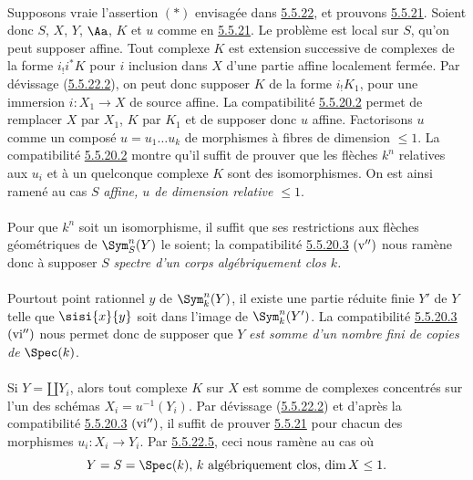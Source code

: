 \documentclass[10pt]{../fichiers-configuration-latex/smfart}
\begin{document}
\paragraph{}
Supposons vraie l'assertion $(\ast)$ envisagée dans \hyperref[XVII.lem5.5.22]{5.5.22}, et
prouvons \hyperref[XVII.thm5.5.21]{5.5.21}. Soient donc $S$, $X$, $Y$, $\Aa$, $K$ et $u$
comme en \hyperref[XVII.thm5.5.21]{5.5.21}. Le problème est local sur $S$, qu'on peut supposer
affine. Tout complexe $K$ est extension successive de complexes de la
forme $i_{!}i^{\ast}K$ pour $i$ inclusion dans $X$ d'une partie affine
localement fermée. Par dévissage (\hyperref[XVII.lem5.5.22.2]{5.5.22.2}), on peut donc supposer $K$
de la forme $i_{!}K_{1}$, pour une immersion $i:X_{1}\rightarrow X$ de
source affine. La compatibilité \hyperref[XVII.par5.5.20.2]{5.5.20.2} permet de remplacer $X$ par
$X_{1}$, $K$ par $K_{1}$ et de supposer donc $u$ affine. Factorisons
$u$ comme un composé $u=u_{1}\ldots u_{k}$ de morphismes à fibres de
dimension $\leq 1$. La compatibilité \hyperref[XVII.par5.5.20.2]{5.5.20.2} montre qu'il suffit de
prouver que les flèches $k^{n}$ relatives aux $u_{i}$ et à un
quelconque complexe $K$ sont des isomorphismes. On est ainsi ramené au
cas $S$ \emph{affine, $u$ de dimension relative $\leq 1$}.

\paragraph{}
Pour que $k^{n}$ soit un isomorphisme, il suffit que ses restrictions
aux flèches géométriques de $\Sym^{n}_{S}(Y)$ le soient; la
compatibilité \hyperref[XVII.par5.5.20.3]{5.5.20.3} ${\rm(v'')}$ nous ramène donc à supposer $S$
\emph{spectre d'un corps algébriquement clos $k$.}

\paragraph{}
Pour\pageoriginale tout point rationnel $y$ de $\Sym^{n}_{k}(Y)$, il
existe une partie réduite finie $Y'$ de $Y$ telle que $\sisi{x}{y}$ soit dans
l'image de $\Sym^{n}_{k}(Y')$. La compatibilité \hyperref[XVII.par5.5.20.3]{5.5.20.3} ${\rm(vi'')}$
nous permet donc de supposer que $Y$ \emph{est somme d'un nombre fini
de copies de} $\Spec(k)$.

\paragraph{}
Si $Y=\amalg Y_{i}$, alors tout complexe $K$ sur $X$ est somme de
complexes concentrés sur l'un des schémas $X_{i}=u^{-1}(Y_{i})$. Par
dévissage (\hyperref[XVII.lem5.5.22.2]{5.5.22.2}) et d'après la compatibilité
\hyperref[XVII.par5.5.20.3]{5.5.20.3}
${\rm (vi'')}$, il suffit de prouver \hyperref[XVII.thm5.5.21]{5.5.21} pour chacun des morphismes
$u_{i}:X_{i}\rightarrow Y_{i}$. Par \hyperref[XVII.par5.5.22.5]{5.5.22.5}, ceci nous ramène au cas
où
$$
\text{\rm $Y=S=\Spec(k)$, $k$ algébriquement clos, $\dim X\leq 1$.}
$$
\end{document}
